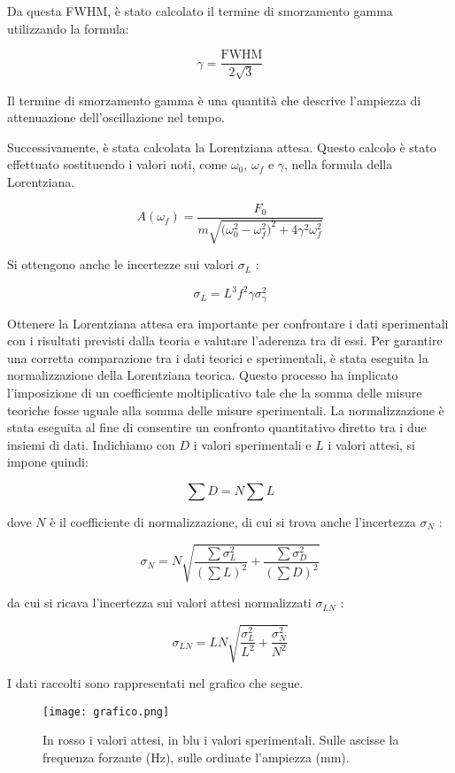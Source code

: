 \documentclass[12pt]{article}
\begin{document}
Da questa FWHM, è stato calcolato il termine di smorzamento gamma utilizzando la formula:

\[ \gamma = \frac{\mathrm{{FWHM}}}{2\sqrt{3}} \]

Il termine di smorzamento gamma è una quantità che descrive l'ampiezza di attenuazione dell'oscillazione nel tempo.

Successivamente, è stata calcolata la Lorentziana attesa. Questo calcolo è stato effettuato sostituendo i valori noti, come $\omega_0$, $\omega_f$ e $\gamma$, nella formula della Lorentziana. 

\[ A(\omega_f)=\frac{F_0}{m\sqrt{\bigg(\omega_0^2-\omega_f^2\bigg)^2+4\gamma^2\omega_f^2}} \]

Si ottengono anche le incertezze sui valori $\sigma_L$ :

\[ \sigma_{L}=L^3f^2\gamma\sigma_{\gamma}^2 \]

Ottenere la Lorentziana attesa era importante per confrontare i dati sperimentali con i risultati previsti dalla teoria e valutare l'aderenza tra di essi. Per garantire una corretta comparazione tra i dati teorici e sperimentali, è stata eseguita la normalizzazione della Lorentziana teorica. Questo processo ha implicato l'imposizione di un coefficiente moltiplicativo tale che la somma delle misure teoriche fosse uguale alla somma delle misure sperimentali. La normalizzazione è stata eseguita al fine di consentire un confronto quantitativo diretto tra i due insiemi di dati.
Indichiamo con $D$ i valori sperimentali e $L$ i valori attesi, si impone quindi:

\[ \sum D=N\sum L \]

dove $N$ è il coefficiente di normalizzazione, di cui si trova anche l'incertezza $\sigma_N$ :

\[ \sigma_N=N\sqrt{\frac{\sum \sigma_L^2}{(\sum L)^2}+\frac{\sum \sigma_D^2}{(\sum D)^2}} \]

da cui si ricava l'incertezza sui valori attesi normalizzati $\sigma_{LN}$ :

\[
  \sigma_{LN}=LN\sqrt{\frac{\sigma_L^2}{L^2}+\frac{\sigma_N^2}{N^2}}
\]

I dati raccolti sono rappresentati nel grafico che segue.
\begin{figure}[htbp]
  \centering
  \texttt{[image: grafico.png]}
  \captionsetup{labelformat=empty}
  \caption{In rosso i valori attesi, in blu i valori sperimentali. Sulle ascisse la frequenza forzante (Hz), sulle ordinate l'ampiezza (mm).}
  \label{fig:grafico}
\end{figure}
\end{document}
